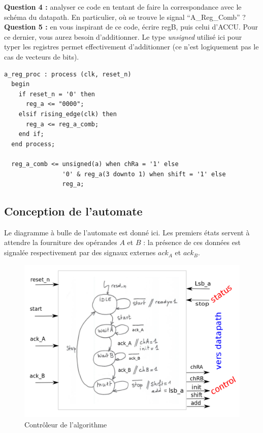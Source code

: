 \documentclass[a4paper,11pt]{article}
\begin{document}
{\bf Question 4 :} analyser ce code en tentant de faire la correspondance avec le schéma du datapath. En particulier, où se trouve le signal ``A\_Reg\_Comb'' ?\\

{\bf Question 5 :} en vous inspirant de ce code, écrire regB, puis celui d'ACCU. Pour ce dernier, vous aurez besoin d'additionner. Le type {\it unsigned} utilisé ici pour typer les registres permet effectivement d'additionner (ce n'est logiquement pas le cas de vecteurs de bits).\\

\begin{lstlisting}[caption=registre A et logique combinatoire associée, label=amb]
 a_reg_proc : process (clk, reset_n)
  begin
    if reset_n = '0' then
      reg_a <= "0000";
    elsif rising_edge(clk) then
      reg_a <= reg_a_comb;
    end if;
  end process;

  reg_a_comb <= unsigned(a) when chRa = '1' else
                '0' & reg_a(3 downto 1) when shift = '1' else
                reg_a;
\end{lstlisting}


\subsection{Conception de l'automate}

Le diagramme à bulle de l'automate est donné ici. Les premiers états servent à attendre la fourniture des opérandes $A$ et $B$ : la présence de ces données est signalée respectivement par des signaux externes $ack_A$ et $ack_B$.

\begin{figure}[!h]
\begin{center}
\includegraphics[scale=0.4]{./figures/controleur_fsm.png}
\end{center}
\caption{Contrôleur de l'algorithme}
\end{figure}
\FloatBarrier
\end{document}

